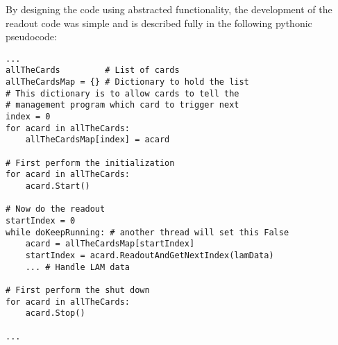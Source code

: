	By designing the code using abstracted functionality, the development of the readout code was simple and is described
fully in the following pythonic pseudocode:
			\lstset{language=Python}
			\begin{lstlisting}
...
allTheCards         # List of cards 
allTheCardsMap = {} # Dictionary to hold the list
# This dictionary is to allow cards to tell the
# management program which card to trigger next
index = 0
for acard in allTheCards:
    allTheCardsMap[index] = acard

# First perform the initialization
for acard in allTheCards:
	acard.Start()

# Now do the readout 
startIndex = 0
while doKeepRunning: # another thread will set this False 
    acard = allTheCardsMap[startIndex]
    startIndex = acard.ReadoutAndGetNextIndex(lamData)
    ... # Handle LAM data

# First perform the shut down 
for acard in allTheCards:
	acard.Stop()

...
			\end{lstlisting}

